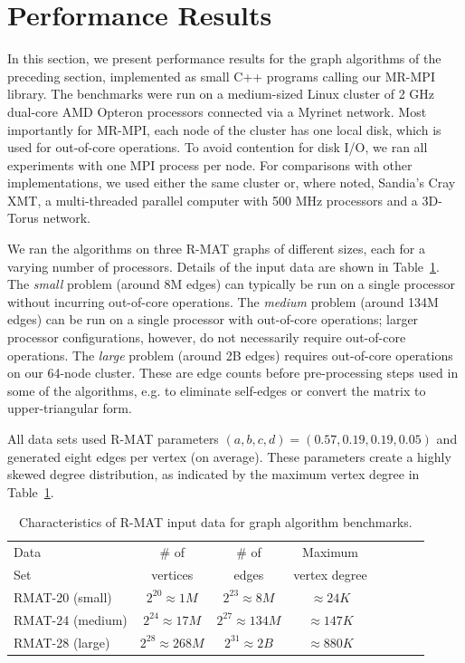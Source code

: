 \section{Performance Results}
\label{sec:results}

In this section, we present performance results for the graph
algorithms of the preceding section, implemented as small C++
programs calling our MR-MPI library.  The benchmarks were run on a
medium-sized Linux cluster of 2 GHz dual-core AMD Opteron processors
connected via a Myrinet network.  Most importantly for MR-MPI, each
node of the cluster has one local disk, which is used for out-of-core
operations.  To avoid contention for disk I/O, we ran all experiments
with one MPI process per node.  For comparisons with other
implementations, we used either the same cluster or, where noted,
Sandia's Cray XMT, a multi-threaded parallel computer with 500 {MHz}
processors and a 3D-Torus network.

We ran the algorithms on three R-MAT graphs of different sizes, each
for a varying number of processors.  Details of the input data are
shown in Table~\ref{t:rmats}.  The {\it small} problem (around 8M
edges) can typically be run on a single processor without incurring
out-of-core operations.  The {\it medium} problem (around 134M edges)
can be run on a single processor with out-of-core operations; larger
processor configurations, however, do not necessarily require
out-of-core operations.  The {\it large} problem (around 2B edges)
requires out-of-core operations on our 64-node cluster.  These are
edge counts before pre-processing steps used in some of the
algorithms, e.g. to eliminate self-edges or convert the matrix to
upper-triangular form.


All data sets used R-MAT parameters $(a, b, c, d) = (0.57, 0.19, 0.19,
0.05)$ and generated eight edges per vertex (on average).  These
parameters create a highly skewed degree distribution, as indicated by
the maximum vertex degree in Table~\ref{t:rmats}.

\begin{table}
\begin{center}
\begin{tabular}{|l|c|c|c|c|c|c|c|}
\hline
Data & \# of    & \# of & Maximum \\
Set  & vertices & edges & vertex degree\\
\hline
RMAT-20 (small)   &$2^{20} \approx 1M$ & $2^{23} \approx 8M$ &  $\approx 24K$ \\
RMAT-24 (medium)  &$2^{24} \approx 17M$ & $2^{27} \approx 134M$ &  $\approx 147K$ \\
RMAT-28 (large)   &$2^{28} \approx 268M$ & $2^{31} \approx 2B$& $\approx 880K$ \\
\hline
\end{tabular}
\caption{Characteristics of R-MAT input data for graph algorithm
benchmarks.}
\label{t:rmats}
\end{center}
\end{table}

